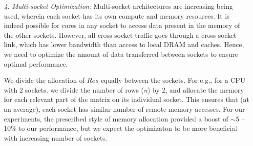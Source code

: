     

     \vspace*{0.1in}
     {\it{4. Multi-socket Optimization}}: 
     Multi-socket architectures are increasing being used,
     wherein each socket has its own
     compute and memory resources. It is indeed possible for cores in
     any socket to access data present in the memory of the other
     sockets. However, all cross-socket traffic goes through a
     cross-socket link, which has lower bandwidth than access to local
     DRAM and caches. Hence, we need to optimize the amount of data
     transferred between sockets to ensure optimal performance.

     We divide the allocation of $Res$ equally between
     the sockets. For e.g., for a CPU with 2 sockets, we divide the
     number of rows ({\it{n}}) by 2, and allocate the memory for each
     relevant part of the matrix on its individual socket. This
     ensures that (at an average), each socket has similar number of
     remote memory accesses. For our experiments, the
     prescribed style of memory allocation provided a boost of
     $\sim$5 -- 10\% to our performance, but we expect the optimizaton
     to be more beneficial with increasing number of
     sockets.
     
     







